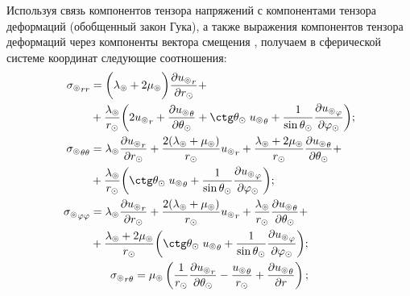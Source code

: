 Используя связь компонентов тензора напряжений с компонентами тензора деформаций (обобщенный закон Гука), а также выражения компонентов тензора деформаций через компоненты вектора смещения \cite{Nowacki}, получаем в сферической системе координат следующие соотношения:
\begin{equation}\label{tensor comp}
    \begin{gathered}
    \begin{aligned}
        {\sigma_\circledcirc}_{rr} &= \biggl(\lambda_\circledcirc+2\mu_\circledcirc\biggr)\frac{\partial {u_\circledcirc}_r}{\partial r_\odot} +\\
        &+ \frac{\lambda_\circledcirc} {r_\odot} \biggl(2{u_\circledcirc}_r+\frac{\partial {u_\circledcirc}_\theta}{\partial\theta_\odot}+\ctg\theta_\odot\;{u_\circledcirc}_\theta + \frac{1}{\sin\theta_\odot}\frac{\partial {u_\circledcirc}_\varphi}{\partial\varphi_\odot}\biggr);\\        
        {\sigma_\circledcirc}_{\theta\theta} &= \lambda_\circledcirc\frac{\partial {u_\circledcirc}_r}{\partial r_\odot} + \frac{2(\lambda_\circledcirc+\mu_\circledcirc)}{r_\odot} {u_\circledcirc}_r + \frac{\lambda_\circledcirc+2\mu_\circledcirc}{r_\odot} \frac{\partial {u_\circledcirc}_\theta}{\partial\theta_\odot} +\\
         &+ \frac{\lambda_\circledcirc}{r_\odot} \biggl(\ctg\theta_\odot \;{u_\circledcirc}_\theta + \frac{1}{\sin\theta_\odot}\frac{\partial {u_\circledcirc}_\varphi}{\partial\varphi_\odot}\biggr);\\
        {\sigma_\circledcirc}_{\varphi\varphi} &= \lambda_\circledcirc\frac{\partial {u_\circledcirc}_r}{\partial r_\odot} + \frac{2(\lambda_\circledcirc+\mu_\circledcirc)}{r_\odot} {u_\circledcirc}_r + \frac{\lambda_\circledcirc}{r_\odot} \frac{\partial {u_\circledcirc}_\theta}{\partial\theta_\odot} +\\
        &+ \frac{\lambda_\circledcirc+2\mu_\circledcirc}{r_\odot}\biggl(\ctg\theta_\odot \;{u_\circledcirc}_\theta + \frac{1}{\sin\theta_\odot}\frac{\partial {u_\circledcirc}_\varphi}{\partial\varphi_\odot}\biggr);\\
    \end{aligned}\\
    \begin{aligned}
        {\sigma_\circledcirc}_{r\theta}=\mu_\circledcirc&\left(\frac1{r_\odot} \frac{\partial {u_\circledcirc}_r}{\partial\theta_\odot} - \frac{{u_\circledcirc}_\theta}{r_\odot} + \frac{\partial {u_\circledcirc}_\theta}{\partial r}\right);\\

\end{aligned}
\end{gathered}
\end{equation}

